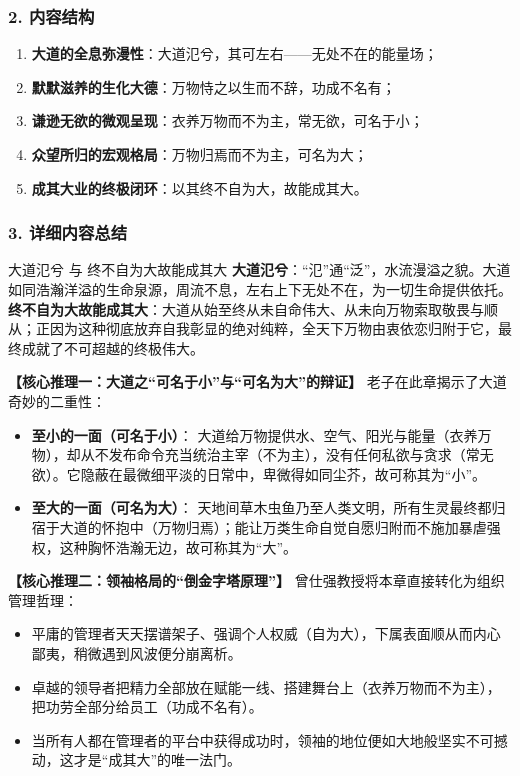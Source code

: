 \subsubsection{2. 内容结构}
\begin{enumerate}
    \item \textbf{大道的全息弥漫性}：大道氾兮，其可左右——无处不在的能量场；
    \item \textbf{默默滋养的生化大德}：万物恃之以生而不辞，功成不名有；
    \item \textbf{谦逊无欲的微观呈现}：衣养万物而不为主，常无欲，可名于小；
    \item \textbf{众望所归的宏观格局}：万物归焉而不为主，可名为大；
    \item \textbf{成其大业的终极闭环}：以其终不自为大，故能成其大。
\end{enumerate}

\subsubsection{3. 详细内容总结}

\begin{ConceptBox}{大道氾兮 与 终不自为大故能成其大}
\textbf{大道氾兮}：“氾”通“泛”，水流漫溢之貌。大道如同浩瀚洋溢的生命泉源，周流不息，左右上下无处不在，为一切生命提供依托。\\
\textbf{终不自为大故能成其大}：大道从始至终从未自命伟大、从未向万物索取敬畏与顺从；正因为这种彻底放弃自我彰显的绝对纯粹，全天下万物由衷依恋归附于它，最终成就了不可超越的终极伟大。
\end{ConceptBox}

\noindent\textbf{【核心推理一：大道之“可名于小”与“可名为大”的辩证】}
老子在此章揭示了大道奇妙的二重性：
\begin{itemize}
    \item \textbf{至小的一面（可名于小）}：
    大道给万物提供水、空气、阳光与能量（衣养万物），却从不发布命令充当统治主宰（不为主），没有任何私欲与贪求（常无欲）。它隐蔽在最微细平淡的日常中，卑微得如同尘芥，故可称其为“小”。
    \item \textbf{至大的一面（可名为大）}：
    天地间草木虫鱼乃至人类文明，所有生灵最终都归宿于大道的怀抱中（万物归焉）；能让万类生命自觉自愿归附而不施加暴虐强权，这种胸怀浩瀚无边，故可称其为“大”。
\end{itemize}

\noindent\textbf{【核心推理二：领袖格局的“倒金字塔原理”】}
曾仕强教授将本章直接转化为组织管理哲理：
\begin{itemize}
    \item 平庸的管理者天天摆谱架子、强调个人权威（自为大），下属表面顺从而内心鄙夷，稍微遇到风波便分崩离析。
    \item 卓越的领导者把精力全部放在赋能一线、搭建舞台上（衣养万物而不为主），把功劳全部分给员工（功成不名有）。
    \item 当所有人都在管理者的平台中获得成功时，领袖的地位便如大地般坚实不可撼动，这才是“成其大”的唯一法门。
\end{itemize}

